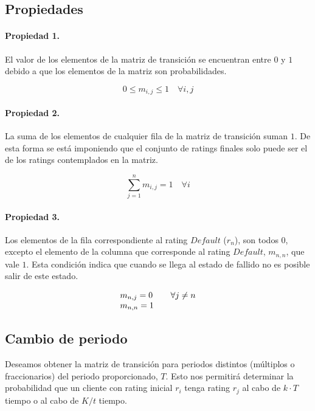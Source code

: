 \subsection{Propiedades}

\paragraph{Propiedad 1.}
El valor de los elementos de la matriz de transici\'on se encuentran entre $0$ 
y $1$ debido a que los elementos de la matriz son probabilidades.

\begin{displaymath}
0 \leq m_{i,j} \leq 1 \quad \forall i,j
\end{displaymath}

\paragraph{Propiedad 2.}
La suma de los elementos de cualquier fila de la matriz de transici\'on suman $1$.
De esta forma se  est\'a imponiendo que el conjunto de ratings finales solo puede 
ser el de los ratings contemplados en la matriz.

\begin{displaymath}
\sum_{j=1}^{n} m_{i,j} = 1 \quad \forall i
\end{displaymath}

\paragraph{Propiedad 3.}
Los elementos de la fila correspondiente al rating $Default$ ($r_n$), son todos 
$0$, excepto el elemento de la columna que corresponde al rating $Default$, 
$m_{n,n}$, que vale $1$. Esta condici\'on indica que cuando se llega al estado 
de fallido no es posible salir de este estado.

\begin{displaymath}
\begin{array}{ll}
m_{n,j} = 0        & \quad \forall j \neq n \cr
m_{n,n} = 1
\end{array}
\end{displaymath}


\subsection{Cambio de periodo}

Deseamos obtener la matriz de transici\'on para periodos distintos (m\'ultiplos o 
fraccionarios) del periodo proporcionado, $T$. Esto nos permitir\'a determinar la 
probabilidad que un cliente con rating inicial $r_i$ tenga rating $r_j$ al cabo 
de $k \cdot T$ tiempo o al cabo de $K/t$ tiempo.

